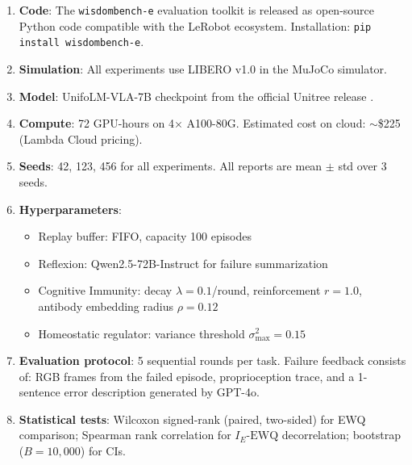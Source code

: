 ﻿\documentclass{article}
\newcommand{\EWQ}{\mathrm{EWQ}}
\begin{document}
\begin{enumerate}[leftmargin=*,itemsep=4pt]
  \item \textbf{Code}: The \texttt{wisdombench-e} evaluation toolkit is
    released as open-source Python code compatible with the LeRobot
    ecosystem. Installation: \texttt{pip install wisdombench-e}.
  \item \textbf{Simulation}: All experiments use LIBERO v1.0
    \citep{liu2024libero} in the MuJoCo simulator.
  \item \textbf{Model}: UnifoLM-VLA-7B checkpoint from the official
    Unitree release \citep{unitree2026unifolm}.
  \item \textbf{Compute}: 72 GPU-hours on 4$\times$ A100-80G.
    Estimated cost on cloud: $\sim$\$225 (Lambda Cloud pricing).
  \item \textbf{Seeds}: 42, 123, 456 for all experiments.
    All reports are mean $\pm$ std over 3 seeds.
  \item \textbf{Hyperparameters}:
    \begin{itemize}[nosep]
      \item Replay buffer: FIFO, capacity 100 episodes
      \item Reflexion: Qwen2.5-72B-Instruct for failure summarization
      \item Cognitive Immunity: decay $\lambda = 0.1$/round,
        reinforcement $r = 1.0$, antibody embedding radius $\rho = 0.12$
      \item Homeostatic regulator: variance threshold $\sigma^2_{\max} = 0.15$
    \end{itemize}
  \item \textbf{Evaluation protocol}: 5 sequential rounds per task.
    Failure feedback consists of: RGB frames from the failed episode,
    proprioception trace, and a 1-sentence error description generated
    by GPT-4o.
  \item \textbf{Statistical tests}: Wilcoxon signed-rank (paired,
    two-sided) for EWQ comparison; Spearman rank correlation for
    $I_E$-$\EWQ$ decorrelation; bootstrap ($B{=}10{,}000$) for CIs.
\end{enumerate}
\end{document}
